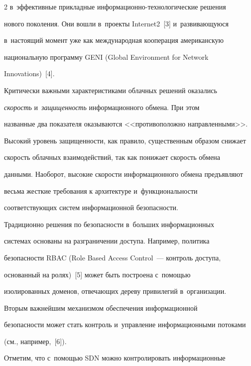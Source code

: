 \begin{multicols}{2}
в~эффективные прикладные ин\-фор\-ма\-ци\-он\-но-тех\-но\-ло\-ги\-че\-ские решения 


нового поколения. Они вошли в~проекты Internet2~[3] и~раз\-ви\-ва\-ющу\-юся 


в~настоящий момент уже как международная кооперация американскую 


национальную программу GENI (Global Environment for Network 


Innovations)~[4]. 


  


  Критически важными характеристиками облачных решений оказались 


\textit{скорость} и~\textit{защищенность} информационного обмена. При этом 


названные два показателя оказываются <<противоположно направленными>>. 


Высокий уровень защищенности, как правило, существенным образом снижает 


скорость облачных взаимодействий, так как  понижает скорость обмена 


данными. Наоборот, высокие скорости информационного обмена предъявляют 


весьма жесткие требования к архитектуре и~функциональности 


соответствующих систем информационной безопасности. 


  


  Традиционно решения по безопасности в~больших информационных 


системах основаны на разграничении доступа. Например, политика 


безопасности RBAC (Role Based Access Control~--- контроль доступа, 


основанный на ролях)~[5] может быть построена с~по\-мощью 


изолированных доменов, отвечающих дереву привилегий в~организации.


  


  Вторым важнейшим механизмом обеспечения информационной 


безопасности может стать контроль и~управление информационными потоками 


(см., например,~[6]).


  


  Отметим, что с~помощью SDN можно контролировать информационные 



\end{multicols}
